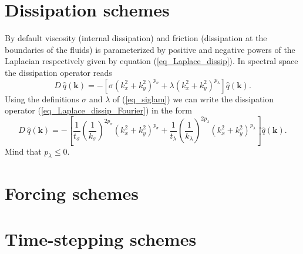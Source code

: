 \section{Dissipation schemes} 
\label{ssec_Dschemes}
By default viscosity (internal dissipation) and friction
(dissipation at the boundaries of the fluids) is parameterized 
by positive and negative powers of the Laplacian respectively given
by equation (\ref{eq_Laplace_dissip}). In spectral space the dissipation
operator reads
\begin{equation} \label{eq_Laplace_dissip_Fourier}
   D \ \hat{q}(\mathbf{k})
    = - \left[
         \sigma \left(k_{x}^{2} + k_{y}^{2} \right)^{p_{\sigma}}
            + 
         \lambda \left(k_{x}^{2} + k_{y}^{2} \right)^{p_{\lambda}}
        \right]
        \hat{q}(\mathbf{k}).
\end{equation}
Using the definitions $\sigma$ and $\lambda$ of (\ref{eq_siglam})
we can write the dissipation operator (\ref{eq_Laplace_dissip_Fourier})
in the form
\begin{equation} \label{eq_Laplace_dissip_Fourier2}
   D \ \hat{q}(\mathbf{k})
    = - \left[
         \frac{1}{t_{\sigma}} 
         \left(\frac{1}{k_{\sigma}}\right)^{2 p_{\sigma}}  
         \left(k_{x}^{2} + k_{y}^{2} \right)^{p_{\sigma}}
          + 
         \frac{1}{t_{\lambda}} 
         \left(\frac{1}{k_{\lambda}}\right)^{2 p_{\lambda}}
         \left(k_{x}^{2} + k_{y}^{2} \right)^{p_{\lambda}}
        \right]
        \hat{q}(\mathbf{k}).
\end{equation}
Mind that $p_{\lambda} \le 0$. 


\section{Forcing schemes}
\label{ssec_Fschemes}



\section{Time-stepping schemes}
\label{ssec_Tschemes}


